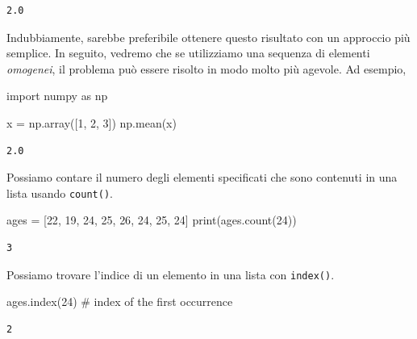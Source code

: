 \documentclass[
  letterpaper,
  krantz2]{{[}./krantz{]}}
\newenvironment{Shaded}{\begin{snugshade}}{\end{snugshade}}
\newcommand{\BuiltInTok}[1]{\textcolor[rgb]{0.00,0.23,0.31}{#1}}
\newcommand{\CommentTok}[1]{\textcolor[rgb]{0.37,0.37,0.37}{#1}}
\newcommand{\DecValTok}[1]{\textcolor[rgb]{0.68,0.00,0.00}{#1}}
\newcommand{\ImportTok}[1]{\textcolor[rgb]{0.00,0.46,0.62}{#1}}
\newcommand{\NormalTok}[1]{\textcolor[rgb]{0.00,0.23,0.31}{#1}}
\newcommand{\OperatorTok}[1]{\textcolor[rgb]{0.37,0.37,0.37}{#1}}
\begin{document}
\begin{verbatim}
2.0
\end{verbatim}

Indubbiamente, sarebbe preferibile ottenere questo risultato con un
approccio più semplice. In seguito, vedremo che se utilizziamo una
sequenza di elementi \emph{omogenei}, il problema può essere risolto in
modo molto più agevole. Ad esempio,

\begin{Shaded}
\begin{Highlighting}[]
\ImportTok{import}\NormalTok{ numpy }\ImportTok{as}\NormalTok{ np}

\NormalTok{x }\OperatorTok{=}\NormalTok{ np.array([}\DecValTok{1}\NormalTok{, }\DecValTok{2}\NormalTok{, }\DecValTok{3}\NormalTok{])}
\NormalTok{np.mean(x)}
\end{Highlighting}
\end{Shaded}

\begin{verbatim}
2.0
\end{verbatim}

Possiamo contare il numero degli elementi specificati che sono contenuti
in una lista usando \texttt{count()}.

\begin{Shaded}
\begin{Highlighting}[]
\NormalTok{ages }\OperatorTok{=}\NormalTok{ [}\DecValTok{22}\NormalTok{, }\DecValTok{19}\NormalTok{, }\DecValTok{24}\NormalTok{, }\DecValTok{25}\NormalTok{, }\DecValTok{26}\NormalTok{, }\DecValTok{24}\NormalTok{, }\DecValTok{25}\NormalTok{, }\DecValTok{24}\NormalTok{]}
\BuiltInTok{print}\NormalTok{(ages.count(}\DecValTok{24}\NormalTok{))         }
\end{Highlighting}
\end{Shaded}

\begin{verbatim}
3
\end{verbatim}

Possiamo trovare l'indice di un elemento in una lista con
\texttt{index()}.

\begin{Shaded}
\begin{Highlighting}[]
\NormalTok{ages.index(}\DecValTok{24}\NormalTok{)  }\CommentTok{\# index of the first occurrence}
\end{Highlighting}
\end{Shaded}

\begin{verbatim}
2
\end{verbatim}
\end{document}
